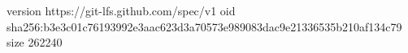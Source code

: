 version https://git-lfs.github.com/spec/v1
oid sha256:b3e3c01c76193992e3aac623d3a70573e989083dac9e21336535b210af134c79
size 262240

